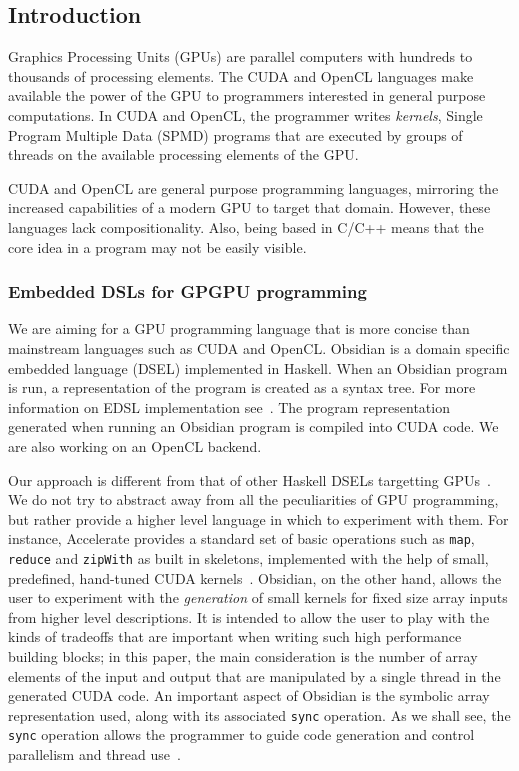 

\subsection{Introduction} 

%


Graphics Processing Units (GPUs) are parallel computers with hundreds 
to thousands of processing elements. The CUDA and OpenCL languages  
make available the power of the GPU to programmers interested in general 
purpose computations. In CUDA and OpenCL, the programmer writes {\em kernels}, 
Single Program Multiple Data (SPMD) programs that are executed by groups 
of threads on the available processing elements of the GPU.  

CUDA and OpenCL are general purpose programming languages, mirroring the 
increased capabilities of a modern GPU to target that domain. However, these 
languages lack compositionality. 
Also, being based in C/C++ means that the core idea in a program may
not be easily visible.  

\subsubsection{Embedded DSLs for GPGPU programming} 
We are aiming for a GPU programming language that is more
concise than mainstream
languages such as CUDA and OpenCL. 
Obsidian is a
domain specific embedded language (DSEL) implemented in Haskell.
When an Obsidian program is run, a representation of the program is created 
as a syntax tree. For more information on EDSL implementation see~\cite{COMPILEEDSL}.
The program representation generated when running an Obsidian program 
is compiled into CUDA code. We are also working on an OpenCL backend.

Our approach is different from that of other Haskell DSELs targetting
GPUs~\cite{ACCELERATE,NIKOLA,BARRACUDA}. 
We do not try to abstract away from 
all the peculiarities of GPU programming, but rather provide a higher 
level language in which to experiment with them.
For instance,
Accelerate provides a standard set of basic operations such as 
{\tt map}, {\tt reduce} and {\tt zipWith} as built in skeletons, implemented
with the help of small, predefined, hand-tuned CUDA kernels~\cite{ACCELERATE}. 
Obsidian, on the other hand, allows the user to experiment with the
{\em generation} of small kernels for fixed size array inputs
from higher level descriptions.
It is intended to allow the user to play with the kinds of tradeoffs that are important
when writing such high performance building blocks; in this paper, the main consideration
is the number of array elements of the input and output that are manipulated
by a single thread in the generated CUDA code.
An important aspect of Obsidian is the symbolic array representation used, along
with its associated {\tt sync} operation. As we shall see, the {\tt sync} operation
allows the programmer to guide code generation and control parallelism and thread
use~\cite{JSLIC}.




